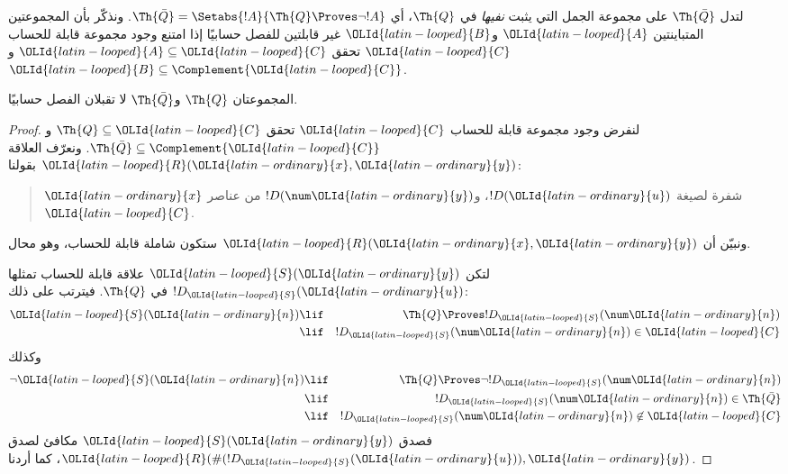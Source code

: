 \documentclass[../../../include/open-logic-section]{subfiles}
\begin{document}



لتدل $\Th{\bar Q}$ على مجموعة الجمل التي يثبت { \em نفيها}
في $\Th{Q}$، أي
$\Th{\bar Q}=\Setabs{!A}{\Th{Q}\Proves\lnot !A}$. ونذكّر بأن
المجموعتين المتباينتين $\OLId{latin-looped}{A}$ و$\OLId{latin-looped}{B}$ غير قابلتين للفصل حسابيًا إذا امتنع
وجود مجموعة قابلة للحساب $\OLId{latin-looped}{C}$ تحقق $\OLId{latin-looped}{A}\subseteq \OLId{latin-looped}{C}$ و
$\OLId{latin-looped}{B}\subseteq\Complement{\OLId{latin-looped}{C}}$.

\begin{lem}
المجموعتان $\Th{Q}$ و$\Th{\bar Q}$ لا تقبلان الفصل حسابيًا.
\end{lem}

\begin{proof}
لنفرض وجود مجموعة قابلة للحساب $\OLId{latin-looped}{C}$ تحقق $\Th{Q}\subseteq \OLId{latin-looped}{C}$ و
$\Th{\bar Q}\subseteq\Complement{\OLId{latin-looped}{C}}$. ونعرّف العلاقة $\OLId{latin-looped}{R}(\OLId{latin-ordinary}{x},\OLId{latin-ordinary}{y})$ بقولنا:
\begin{quote}
$\OLId{latin-ordinary}{x}$ شفرة لصيغة $!D(\OLId{latin-ordinary}{u})$، و$!D(\num \OLId{latin-ordinary}{y})$ من عناصر $\OLId{latin-looped}{C}$.
\end{quote}
ونبيّن أن $\OLId{latin-looped}{R}(\OLId{latin-ordinary}{x},\OLId{latin-ordinary}{y})$ ستكون شاملة قابلة للحساب، وهو محال.

لتكن $\OLId{latin-looped}{S}(\OLId{latin-ordinary}{y})$ علاقة قابلة للحساب تمثلها $!D_\OLId{latin-looped}{S}(\OLId{latin-ordinary}{u})$ في $\Th{Q}$.
فيترتب على ذلك:
\begin{eqnarray*}
\OLId{latin-looped}{S}(\OLId{latin-ordinary}{n}) & \lif & \Th{Q} \Proves !D_\OLId{latin-looped}{S}(\num \OLId{latin-ordinary}{n}) \\
& \lif & !D_\OLId{latin-looped}{S}(\num \OLId{latin-ordinary}{n}) \in \OLId{latin-looped}{C}
\end{eqnarray*}
وكذلك
\begin{eqnarray*}
\lnot \OLId{latin-looped}{S}(\OLId{latin-ordinary}{n}) & \lif & \Th{Q} \Proves \lnot !D_\OLId{latin-looped}{S}(\num \OLId{latin-ordinary}{n}) \\
& \lif & !D_\OLId{latin-looped}{S}(\num \OLId{latin-ordinary}{n}) \in \Th{\bar Q} \\
& \lif & !D_\OLId{latin-looped}{S}(\num \OLId{latin-ordinary}{n}) \not\in \OLId{latin-looped}{C}
\end{eqnarray*}
فصدق $\OLId{latin-looped}{S}(\OLId{latin-ordinary}{y})$ مكافئ لصدق $\OLId{latin-looped}{R}(\#(!D_\OLId{latin-looped}{S}(\OLId{latin-ordinary}{u})),\OLId{latin-ordinary}{y})$، كما أردنا.
\end{proof}
\end{document}
